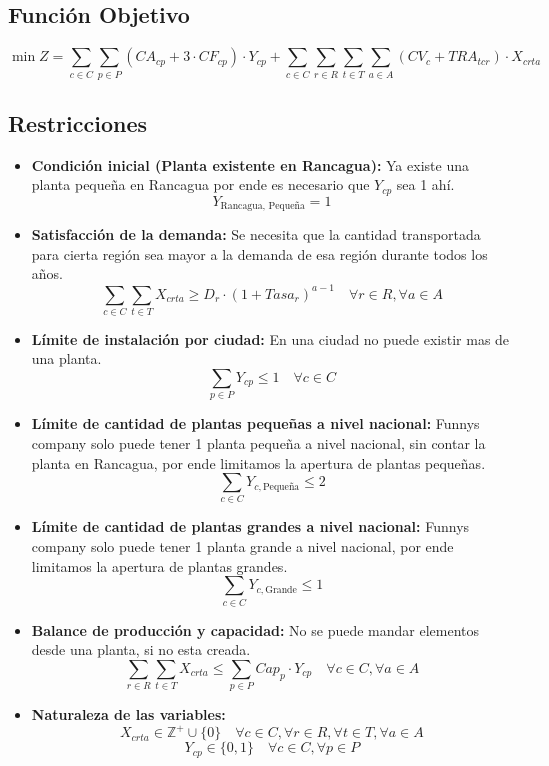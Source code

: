 \documentclass{article}
\begin{document}
\subsection{Función Objetivo}
$$ \min Z = \sum_{c \in C} \sum_{p \in P} \left( CA_{cp} + 3 \cdot CF_{cp} \right) \cdot Y_{cp} + \sum_{c \in C} \sum_{r \in R} \sum_{t \in T} \sum_{a \in A} \left( CV_c + TRA_{tcr} \right) \cdot X_{crta} $$

\subsection{Restricciones}
\begin{itemize}
    \item \textbf{Condición inicial (Planta existente en Rancagua):} Ya existe una planta pequeña en Rancagua por ende es necesario que $Y_{cp}$ sea 1 ahí.
    $$ Y_{\text{Rancagua, Pequeña}} = 1 $$
    
    \item \textbf{Satisfacción de la demanda:} Se necesita que la cantidad transportada para cierta región sea mayor a la demanda de esa región durante todos los años.
    $$ \sum_{c \in C} \sum_{t \in T} X_{crta} \geq D_r \cdot (1 + Tasa_r)^{a-1} \quad \forall r \in R, \forall a \in A $$
    
    \item \textbf{Límite de instalación por ciudad:} En una ciudad no puede existir mas de una planta.
    $$ \sum_{p \in P} Y_{cp} \leq 1 \quad \forall c \in C $$

    \item \textbf{Límite de cantidad de plantas pequeñas a nivel nacional:} Funnys company solo puede tener 1 planta pequeña a nivel nacional, sin contar la planta en Rancagua, por ende limitamos la apertura de plantas pequeñas.
    $$ \sum_{c \in C} Y_{c, \text{Pequeña}} \leq 2 $$

    \item \textbf{Límite de cantidad de plantas grandes a nivel nacional:} Funnys company solo puede tener 1 planta grande a nivel nacional, por ende limitamos la apertura de plantas grandes.
    $$ \sum_{c \in C} Y_{c, \text{Grande}} \leq 1 $$
    
    \item \textbf{Balance de producción y capacidad:} No se puede mandar elementos desde una planta, si no esta creada.
    $$ \sum_{r \in R} \sum_{t \in T} X_{crta} \leq \sum_{p \in P} Cap_p \cdot Y_{cp} \quad \forall c \in C, \forall a \in A $$
    
    \item \textbf{Naturaleza de las variables:}
    $$ X_{crta} \in \mathbb{Z}^+ \cup \{0\} \quad \forall c \in C, \forall r \in R, \forall t \in T, \forall a \in A $$
    $$ Y_{cp} \in \{0, 1\} \quad \forall c \in C, \forall p \in P $$
\end{itemize}
\end{document}
